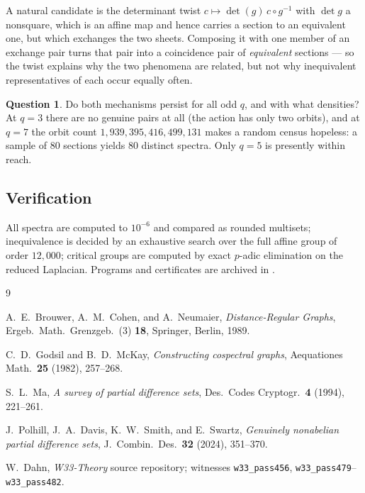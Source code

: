 \documentclass[11pt]{article}
\theoremstyle{plain}
\theoremstyle{definition}
\newtheorem{question}[theorem]{Question}
\begin{document}
A natural candidate is the determinant twist $c\mapsto\det(g)\,c\circ g^{-1}$
with $\det g$ a nonsquare, which is an affine map and hence carries a section
to an equivalent one, but which exchanges the two sheets. Composing it with
one member of an exchange pair turns that pair into a coincidence pair of
\emph{equivalent} sections --- so the twist explains why the two phenomena are
related, but not why inequivalent representatives of each occur equally often.

\begin{question}
Do both mechanisms persist for all odd $q$, and with what densities? At $q=3$
there are no genuine pairs at all (the action has only two orbits), and at
$q=7$ the orbit count $1{,}939{,}395{,}416{,}499{,}131$ makes a random census
hopeless: a sample of $80$ sections yields $80$ distinct spectra. Only $q=5$
is presently within reach.
\end{question}

\subsection*{Verification}

All spectra are computed to $10^{-6}$ and compared as rounded multisets;
inequivalence is decided by an exhaustive search over the full affine group of
order $12{,}000$; critical groups are computed by exact $p$-adic elimination on
the reduced Laplacian. Programs and certificates are archived
in \cite{repo}.

\begin{thebibliography}{9}

A.~E.~Brouwer, A.~M.~Cohen, and A.~Neumaier,
\emph{Distance-Regular Graphs},
Ergeb.\ Math.\ Grenzgeb.\ (3) \textbf{18}, Springer, Berlin, 1989.

C.~D.~Godsil and B.~D.~McKay,
\emph{Constructing cospectral graphs},
Aequationes Math.\ \textbf{25} (1982), 257--268.

S.~L.~Ma,
\emph{A survey of partial difference sets},
Des.\ Codes Cryptogr.\ \textbf{4} (1994), 221--261.

J.~Polhill, J.~A.~Davis, K.~W.~Smith, and E.~Swartz,
\emph{Genuinely nonabelian partial difference sets},
J.~Combin.\ Des.\ \textbf{32} (2024), 351--370.

W.~Dahn, \emph{W33-Theory} source repository; witnesses
\texttt{w33\_pass456}, \texttt{w33\_pass479}--\texttt{w33\_pass482}.

\end{thebibliography}
\end{document}
